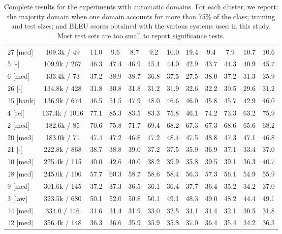 \documentclass[11pt,a4paper]{article}
\begin{document}
\begin{table*}[t]
\begin{tabular}{|p{1.3cm}|*{11}{c|}}
27 \hfill [med]&109.3k / 49&11.0&9.6&8.7&9.2&10.0&19.4&9.4&7.9&10.7&10.6 \\
5 \hfill [-]&109.9k / 267&46.3&47.4&46.9&45.4&44.0&42.9&43.7&44.3&40.9&45.7 \\
6 \hfill [med]&133.4k / 73&37.2&38.9&38.7&36.8&37.5&27.5&38.0&37.2&31.3&35.9 \\
26 \hfill [-]&134.8k / 428&31.8&30.8&31.8&31.2&31.9&32.6&32.2&30.5&29.6&31.2 \\
15 \hfill [bank]&136.9k / 674&46.5&51.5&47.9&48.0&46.6&46.0&45.8&45.7&42.9&46.0 \\
4 \hfill [rel]&137.4k / 1016&77.1&85.3&83.5&83.3&75.8&46.1&74.2&73.3&63.2&75.9 \\
2 \hfill [med]&182.6k / 85&70.6&75.8&71.7&69.4&68.2&67.3&67.3&68.6&65.6&68.2 \\
20 \hfill [med]&183.0k / 71&47.4&47.2&46.8&47.2&48.4&47.5&48.8&47.3&47.1&46.8 \\
21 \hfill [-]&222.8k / 868&38.7&38.8&39.0&37.2&37.5&35.9&36.9&37.1&33.4&37.0 \\
10 \hfill [med]&225.4k / 115&40.0&42.6&40.0&38.2&39.9&35.8&39.5&39.1&36.3&40.7 \\
18 \hfill [med]&245.0k / 106&57.7&60.3&58.7&58.6&58.4&56.3&57.3&56.1&54.9&55.9 \\
9 \hfill [med]&301.6k / 145&37.2&37.3&36.5&36.1&36.4&37.7&36.4&35.2&34.2&37.0 \\
3 \hfill [law]&323.5k / 680&50.1&52.0&50.8&50.1&49.1&48.3&49.0&48.2&44.4&49.1 \\
14 \hfill [med]&334.0 / 146&31.6&31.4&31.9&33.0&32.5&34.1&31.4&32.1&30.5&31.8 \\
12 \hfill [med]&356.4k / 148&36.3&36.6&35.9&35.9&35.8&37.0&36.4&35.4&34.2&36.3 \\ \hline
  \end{tabular}
  \caption{Complete results for the experiments with automatic domains. For each cluster, we report: the majority domain when one domain accounts for more than 75\% of the class; training and test sizes; and BLEU scores obtained with the various systems used in this study. Most test sets are too small to report significance tests.}
  \label{tab:automatic_domains}
\end{table*}
\end{document}
